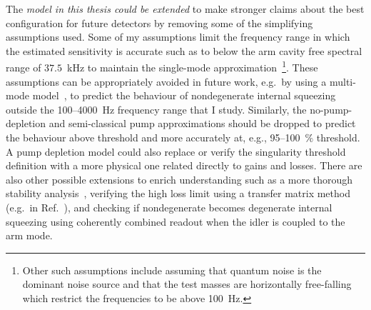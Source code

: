 The \emph{model in this thesis could be extended} to make stronger claims about the best configuration for future detectors by removing some of the simplifying assumptions used.
Some of my assumptions limit the frequency range in which the estimated sensitivity is accurate such as to below the arm cavity free spectral range of $37.5$~kHz to maintain the single-mode approximation~\footnote{Other such assumptions include assuming that quantum noise is the dominant noise source and that the test masses are horizontally free-falling which restrict the frequencies to be above 100~Hz.}. These assumptions can be appropriately avoided in future work, e.g.\ by using a multi-mode model~\cite{liEnhancingInterferometerSensitivity2021}, to predict the behaviour of nondegenerate internal squeezing outside the 100--4000~Hz frequency range that I study.
Similarly, the no-pump-depletion and semi-classical pump approximations should be dropped to predict the behaviour above threshold and more accurately at, e.g., 95--100~$\%$ threshold. A pump depletion model could also replace or verify the singularity threshold definition with a more physical one related directly to gains and losses. 
There are also other possible extensions to enrich understanding such as a more thorough stability analysis~\cite{liEnhancingInterferometerSensitivity2021}, verifying the high loss limit using a transfer matrix method (e.g.\ in Ref.~\cite{korobkoQuantumExpanderGravitationalwave2019}), and checking if nondegenerate becomes degenerate internal squeezing using coherently combined readout when the idler is coupled to the arm mode.


